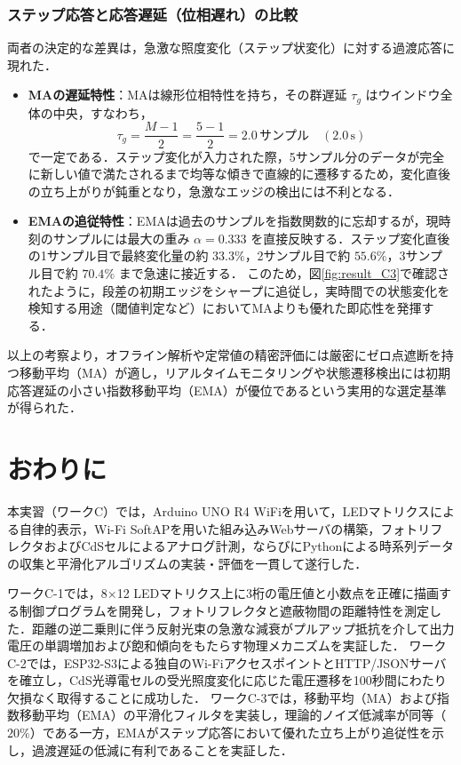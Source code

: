 \subsubsection{ステップ応答と応答遅延（位相遅れ）の比較}
両者の決定的な差異は，急激な照度変化（ステップ状変化）に対する過渡応答に現れた．
\begin{itemize}
    \item \textbf{MAの遅延特性}：MAは線形位相特性を持ち，その群遅延 $\tau_g$ はウインドウ全体の中央，すなわち，
    \begin{equation}
        \tau_g = \frac{M - 1}{2} = \frac{5 - 1}{2} = 2.0\,\mathrm{サンプル} \quad (2.0\,\mathrm{s})
    \end{equation}
    で一定である．ステップ変化が入力された際，5サンプル分のデータが完全に新しい値で満たされるまで均等な傾きで直線的に遷移するため，変化直後の立ち上がりが鈍重となり，急激なエッジの検出には不利となる．
    \item \textbf{EMAの追従特性}：EMAは過去のサンプルを指数関数的に忘却するが，現時刻のサンプルには最大の重み $\alpha = 0.333$ を直接反映する．ステップ変化直後の1サンプル目で最終変化量の約 $33.3\%$，2サンプル目で約 $55.6\%$，3サンプル目で約 $70.4\%$ まで急速に接近する．
    このため，図\ref{fig:result_C3}で確認されたように，段差の初期エッジをシャープに追従し，実時間での状態変化を検知する用途（閾値判定など）においてMAよりも優れた即応性を発揮する．
\end{itemize}
以上の考察より，オフライン解析や定常値の精密評価には厳密にゼロ点遮断を持つ移動平均（MA）が適し，リアルタイムモニタリングや状態遷移検出には初期応答遅延の小さい指数移動平均（EMA）が優位であるという実用的な選定基準が得られた．


\section{おわりに}
本実習（ワークC）では，Arduino UNO R4 WiFiを用いて，LEDマトリクスによる自律的表示，Wi-Fi SoftAPを用いた組み込みWebサーバの構築，フォトリフレクタおよびCdSセルによるアナログ計測，ならびにPythonによる時系列データの収集と平滑化アルゴリズムの実装・評価を一貫して遂行した．

ワークC-1では，8×12 LEDマトリクス上に3桁の電圧値と小数点を正確に描画する制御プログラムを開発し，フォトリフレクタと遮蔽物間の距離特性を測定した．距離の逆二乗則に伴う反射光束の急激な減衰がプルアップ抵抗を介して出力電圧の単調増加および飽和傾向をもたらす物理メカニズムを実証した．
ワークC-2では，ESP32-S3による独自のWi-FiアクセスポイントとHTTP/JSONサーバを確立し，CdS光導電セルの受光照度変化に応じた電圧遷移を100秒間にわたり欠損なく取得することに成功した．
ワークC-3では，移動平均（MA）および指数移動平均（EMA）の平滑化フィルタを実装し，理論的ノイズ低減率が同等（$20\%$）である一方，EMAがステップ応答において優れた立ち上がり追従性を示し，過渡遅延の低減に有利であることを実証した．

